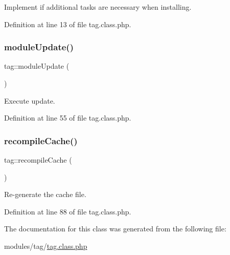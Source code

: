 Implement if additional tasks are necessary when installing. 



Definition at line 13 of file tag.\+class.\+php.

\mbox{\label{classtag_a4ebfee9c57c877da29b92821b3716060}} 
\subsubsection{\texorpdfstring{module\+Update()}{moduleUpdate()}}
{\footnotesize\ttfamily tag\+::module\+Update (\begin{DoxyParamCaption}{ }\end{DoxyParamCaption})}



Execute update. 



Definition at line 55 of file tag.\+class.\+php.

\mbox{\label{classtag_a5776ef44ff2110b18834d6b4ad9b9d2d}} 
\subsubsection{\texorpdfstring{recompile\+Cache()}{recompileCache()}}
{\footnotesize\ttfamily tag\+::recompile\+Cache (\begin{DoxyParamCaption}{ }\end{DoxyParamCaption})}



Re-\/generate the cache file. 



Definition at line 88 of file tag.\+class.\+php.



The documentation for this class was generated from the following file\+:\begin{DoxyCompactItemize}
\item 
modules/tag/\hyperlink{tag_8class_8php}{tag.\+class.\+php}\end{DoxyCompactItemize}
